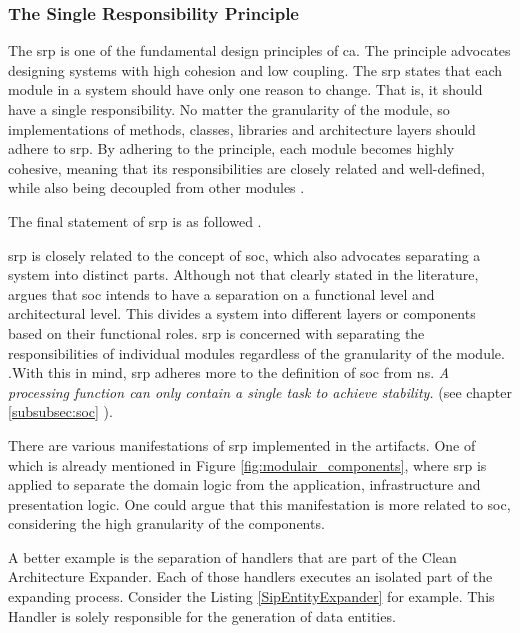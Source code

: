 \subsubsection{The Single Responsibility Principle} \label{subsubsec:srp}

The \gls{srp} is one of the fundamental design principles of \gls{ca}. The principle
advocates designing systems with high cohesion and low coupling. The \gls{srp} states that
each module in a system should have only one reason to change. That is, it should have a
single responsibility. No matter the granularity of the module, so implementations of
methods, classes, libraries and architecture layers should adhere to \gls{srp}. By
adhering to the principle, each module becomes highly cohesive, meaning that its
responsibilities are closely related and well-defined, while also being decoupled from
other modules \parencite[81]{robert_c_martin_clean_2018}.

The final statement of \gls{srp} is as followed
\parencite[82]{robert_c_martin_clean_2018}.


\gls{srp} is closely related to the concept of \gls{soc}, which also advocates separating
a system into distinct parts. Although not that clearly stated in the literature,
\citeauthor{robert_c_martin_clean_2018} argues that \gls{soc} intends to have a separation
on a functional level and architectural level. This divides a system into different layers
or components based on their functional roles. \gls{srp} is concerned with separating the
responsibilities of individual modules regardless of the granularity of the module.
\parencite[205]{robert_c_martin_clean_2018}.With this in mind, \gls{srp} adheres more to
the definition of \gls{soc} from \gls{ns}. \textit{A processing function can only contain
a single task to achieve stability.} (see chapter \ref{subsubsec:soc}
).

There are various manifestations of \gls{srp} implemented in the artifacts. One of which is
already mentioned in Figure \ref{fig:modulair_components}, where \gls{srp} is applied to
separate the domain logic from the application, infrastructure and presentation logic. One
could argue that this manifestation is more related to \gls{soc}, considering the high
granularity of the components.

A better example is the separation of handlers that are part of the Clean Architecture
Expander. Each of those handlers executes an isolated part of the expanding process.
Consider the Listing \ref{SipEntityExpander} 
\parencite{koks_expandentitieshandlerinteractor_2023} for example. This Handler is solely
responsible for the generation of data entities. 

